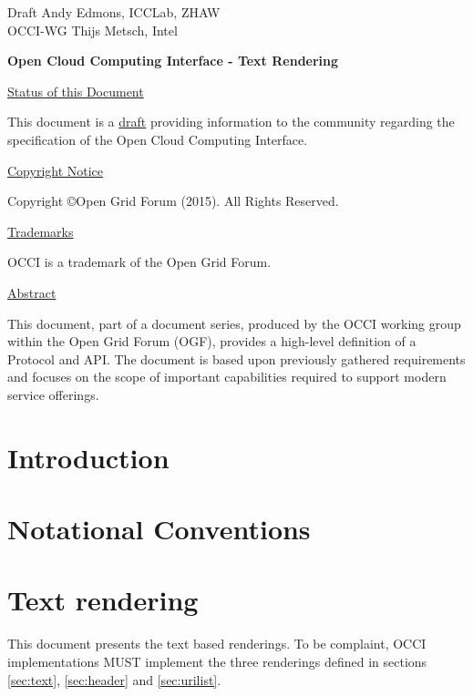 \documentclass[10pt,a4paper]{article}
\begin{document}
\thispagestyle{empty}

Draft \hfill Andy Edmons, ICCLab, ZHAW \\
OCCI-WG \hfill Thijs Metsch, Intel\\
\rightline {\today}

\vspace*{0.5in}

\begin{Large}
\textbf{Open Cloud Computing Interface - Text Rendering}
\end{Large}

\vspace*{0.5in}

\underline{Status of this Document}

This document is a \underline{draft} providing information to the community regarding the specification of the Open Cloud Computing Interface.

\underline{Copyright Notice}

Copyright \copyright Open Grid Forum (2015). All Rights Reserved.

\underline{Trademarks}

OCCI is a trademark of the Open Grid Forum.

\underline{Abstract}

This document, part of a document series, produced by the OCCI working
group within the Open Grid Forum (OGF), provides a high-level
definition of a Protocol and API. The document is based upon
previously gathered requirements and focuses on the scope of important
capabilities required to support modern service offerings.

\newpage
\tableofcontents
\newpage

\section{Introduction}


\section{Notational Conventions}


\section{Text rendering}

This document presents the text based renderings. To be complaint, OCCI implementations MUST implement the three renderings defined in sections \ref{sec:text}, \ref{sec:header} and \ref{sec:urilist}.
\end{document}
